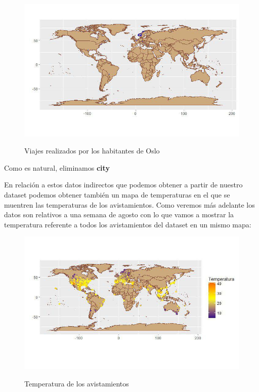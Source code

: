 \begin{figure}[H] %
\centering
\includegraphics[scale=0.8]{img/oslo.jpg}  %
\label{img/oslo.jpg}
\caption{Viajes realizados por los habitantes de Oslo}
\end{figure}

Como es natural, eliminamos \textbf{city}  

En relación a estos datos indirectos que podemos obtener a partir de nuestro dataset podemos obtener también un mapa de temperaturas en el que se muentren las temperaturas de los avistamientos. Como veremos más adelante los datos son relativos a una semana de agosto con lo que vamos a mostrar la temperatura referente a todos los avistamientos del dataset en un mismo mapa:

\begin{figure}[H] %
\centering
\includegraphics[scale=0.8]{img/temperatura.jpg}  %
\label{img/temperatura.jpg}
\caption{Temperatura de los avistamientos}
\end{figure}

